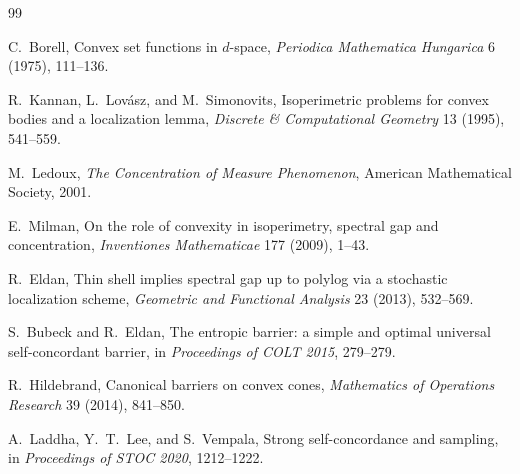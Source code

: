 \documentclass[11pt]{article}
\theoremstyle{definition}
\theoremstyle{remark}
\newcommand{\1}{\mathbf 1}
\begin{document}
\begin{thebibliography}{99}

C.~Borell,
\newblock Convex set functions in \(d\)-space,
\newblock \emph{Periodica Mathematica Hungarica} 6 (1975), 111--136.

R.~Kannan, L.~Lov\'asz, and M.~Simonovits,
\newblock Isoperimetric problems for convex bodies and a localization lemma,
\newblock \emph{Discrete \& Computational Geometry} 13 (1995), 541--559.

M.~Ledoux,
\newblock \emph{The Concentration of Measure Phenomenon},
\newblock American Mathematical Society, 2001.

E.~Milman,
\newblock On the role of convexity in isoperimetry, spectral gap and
concentration,
\newblock \emph{Inventiones Mathematicae} 177 (2009), 1--43.

R.~Eldan,
\newblock Thin shell implies spectral gap up to polylog via a stochastic
localization scheme,
\newblock \emph{Geometric and Functional Analysis} 23 (2013), 532--569.

S.~Bubeck and R.~Eldan,
\newblock The entropic barrier: a simple and optimal universal
self-concordant barrier,
\newblock in \emph{Proceedings of COLT 2015}, 279--279.

R.~Hildebrand,
\newblock Canonical barriers on convex cones,
\newblock \emph{Mathematics of Operations Research} 39 (2014), 841--850.

A.~Laddha, Y.~T.~Lee, and S.~Vempala,
\newblock Strong self-concordance and sampling,
\newblock in \emph{Proceedings of STOC 2020}, 1212--1222.

\end{thebibliography}
\end{document}
